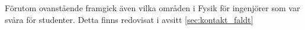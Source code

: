 \begin{draft}
Förutom ovanstående framgick även vilka områden i Fysik för ingenjörer som var svåra för studenter. Detta finns redovisat i avsitt \ref{sec:kontakt_faldt}

\end{draft}






























